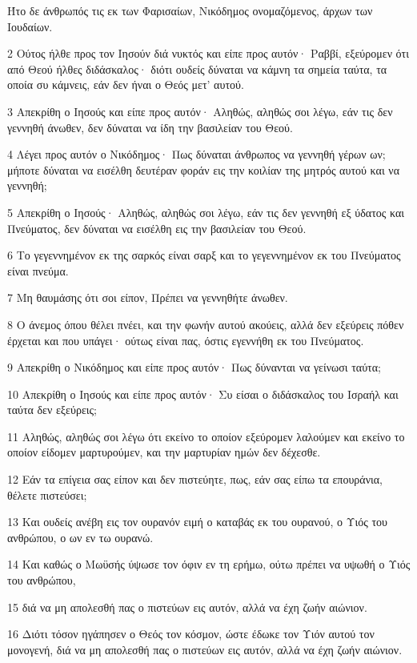 \par Ήτο δε άνθρωπός τις εκ των Φαρισαίων, Νικόδημος ονομαζόμενος, άρχων των Ιουδαίων.
\par 2 Ούτος ήλθε προς τον Ιησούν διά νυκτός και είπε προς αυτόν· Ραββί, εξεύρομεν ότι από Θεού ήλθες διδάσκαλος· διότι ουδείς δύναται να κάμνη τα σημεία ταύτα, τα οποία συ κάμνεις, εάν δεν ήναι ο Θεός μετ' αυτού.
\par 3 Απεκρίθη ο Ιησούς και είπε προς αυτόν· Αληθώς, αληθώς σοι λέγω, εάν τις δεν γεννηθή άνωθεν, δεν δύναται να ίδη την βασιλείαν του Θεού.
\par 4 Λέγει προς αυτόν ο Νικόδημος· Πως δύναται άνθρωπος να γεννηθή γέρων ων; μήποτε δύναται να εισέλθη δευτέραν φοράν εις την κοιλίαν της μητρός αυτού και να γεννηθή;
\par 5 Απεκρίθη ο Ιησούς· Αληθώς, αληθώς σοι λέγω, εάν τις δεν γεννηθή εξ ύδατος και Πνεύματος, δεν δύναται να εισέλθη εις την βασιλείαν του Θεού.
\par 6 Το γεγεννημένον εκ της σαρκός είναι σαρξ και το γεγεννημένον εκ του Πνεύματος είναι πνεύμα.
\par 7 Μη θαυμάσης ότι σοι είπον, Πρέπει να γεννηθήτε άνωθεν.
\par 8 Ο άνεμος όπου θέλει πνέει, και την φωνήν αυτού ακούεις, αλλά δεν εξεύρεις πόθεν έρχεται και που υπάγει· ούτως είναι πας, όστις εγεννήθη εκ του Πνεύματος.
\par 9 Απεκρίθη ο Νικόδημος και είπε προς αυτόν· Πως δύνανται να γείνωσι ταύτα;
\par 10 Απεκρίθη ο Ιησούς και είπε προς αυτόν· Συ είσαι ο διδάσκαλος του Ισραήλ και ταύτα δεν εξεύρεις;
\par 11 Αληθώς, αληθώς σοι λέγω ότι εκείνο το οποίον εξεύρομεν λαλούμεν και εκείνο το οποίον είδομεν μαρτυρούμεν, και την μαρτυρίαν ημών δεν δέχεσθε.
\par 12 Εάν τα επίγεια σας είπον και δεν πιστεύητε, πως, εάν σας είπω τα επουράνια, θέλετε πιστεύσει;
\par 13 Και ουδείς ανέβη εις τον ουρανόν ειμή ο καταβάς εκ του ουρανού, ο Υιός του ανθρώπου, ο ων εν τω ουρανώ.
\par 14 Και καθώς ο Μωϋσής ύψωσε τον όφιν εν τη ερήμω, ούτω πρέπει να υψωθή ο Υιός του ανθρώπου,
\par 15 διά να μη απολεσθή πας ο πιστεύων εις αυτόν, αλλά να έχη ζωήν αιώνιον.
\par 16 Διότι τόσον ηγάπησεν ο Θεός τον κόσμον, ώστε έδωκε τον Υιόν αυτού τον μονογενή, διά να μη απολεσθή πας ο πιστεύων εις αυτόν, αλλά να έχη ζωήν αιώνιον.
